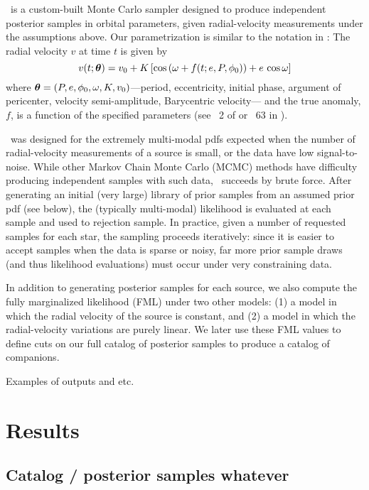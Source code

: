 \documentclass[modern, letterpaper]{aastex61}
\newcommand{\thejoker}{\project{The~Joker}}
\begin{document}
\thejoker\ is a custom-built Monte Carlo sampler designed to produce independent
posterior samples in orbital parameters, given radial-velocity measurements
under the assumptions above.
Our parametrization is similar to the notation in \citet{Murray:2010}:
The radial velocity $v$ at time $t$ is given by
\begin{equation}
  v(t;\bs{\theta}) = v_0 + K\,[\cos\left(\omega + f(t; e, P, \phi_0)\right) +
    e\,\cos\omega]
\end{equation}
where $\boldsymbol{\theta} = (P,e,\phi_0,\omega,K,v_0)$---period, eccentricity, initial
phase, argument of pericenter, velocity semi-amplitude, Barycentric velocity---
and the true anomaly, $f$, is a function of the specified parameters (see
\sectionname~2 of \citealt{Price-Whelan:2017} or \eqname~63 in
\citealt{Murray:2010}).

\thejoker\ was designed for the extremely multi-modal pdfs expected when the
number of radial-velocity measurements of a source is small, or the data have
low signal-to-noise.
While other Markov Chain Monte Carlo (MCMC) methods have difficulty producing
independent samples with such data, \thejoker\ succeeds by brute force.
After generating an initial (very large) library of prior samples from an
assumed prior pdf (see below), the (typically multi-modal) likelihood is
evaluated at each sample and used to rejection sample.
In practice, given a number of requested samples for each star, the sampling
proceeds iteratively: since it is easier to accept samples when the data is
sparse or noisy, far more prior sample draws (and thus likelihood
evaluations) must occur under very constraining data.

In addition to generating posterior samples for each source, we also compute the
fully marginalized likelihood (FML) under two other models: (1) a model in which
the radial velocity of the source is constant, and (2) a model in which the
radial-velocity variations are purely linear.
We later use these FML values to define cuts on our full catalog of posterior
samples to produce a catalog of companions.


Examples of outputs and etc.

\section{Results}

\subsection{Catalog / posterior samples whatever} \label{sec:full-catalog}
\end{document}
